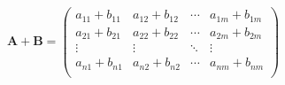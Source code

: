 \begin{equation*}
	\bm{A}+\bm{B} =
	\begin{pmatrix}
		a_{11}+b_{11} & a_{12}+b_{12} & \cdots & a_{1m}+b_{1m} \\
		a_{21}+b_{21} & a_{22}+b_{22} & \cdots & a_{2m}+b_{2m} \\
		\vdots        & \vdots        & \ddots & \vdots        \\
		a_{n1}+b_{n1} & a_{n2}+b_{n2} & \cdots & a_{nm}+b_{nm} \\
	\end{pmatrix}
\end{equation*}
